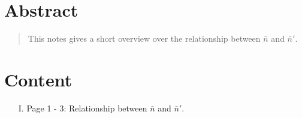\newpage
\section*{Abstract}
\label{s:abstract}
\begin{abstract}
	This notes gives a short overview over the relationship between $\bar{n}$ and $\bar{n}\prime$.
\end{abstract}
\section*{Content}
\label{s:content}
\begin{enumerate}
	\item [I.] Page 1 - 3: Relationship between $\bar{n}$ and $\bar{n}\prime$.
\end{enumerate}

